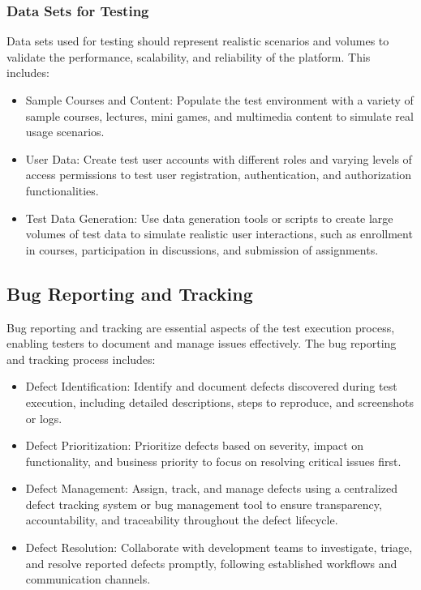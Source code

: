 		\subsubsection{Data Sets for Testing}
		
		Data sets used for testing should represent realistic scenarios and volumes to validate the performance, scalability, and reliability of the platform. This includes:
		
		\begin{itemize}
			\item Sample Courses and Content: Populate the test environment with a variety of sample courses, lectures, mini games, and multimedia content to simulate real usage scenarios.
			\item User Data: Create test user accounts with different roles and varying levels of access permissions to test user registration, authentication, and authorization functionalities.
			\item Test Data Generation: Use data generation tools or scripts to create large volumes of test data to simulate realistic user interactions, such as enrollment in courses, participation in discussions, and submission of assignments.
		\end{itemize}
		
	\subsection{Bug Reporting and Tracking}
	
	Bug reporting and tracking are essential aspects of the test execution process, enabling testers to document and manage issues effectively. The bug reporting and tracking process includes:
	
	\begin{itemize}
		\item Defect Identification: Identify and document defects discovered during test execution, including detailed descriptions, steps to reproduce, and screenshots or logs.
		\item Defect Prioritization: Prioritize defects based on severity, impact on functionality, and business priority to focus on resolving critical issues first.
		\item Defect Management: Assign, track, and manage defects using a centralized defect tracking system or bug management tool to ensure transparency, accountability, and traceability throughout the defect lifecycle.
		\item Defect Resolution: Collaborate with development teams to investigate, triage, and resolve reported defects promptly, following established workflows and communication channels.
	\end{itemize}


